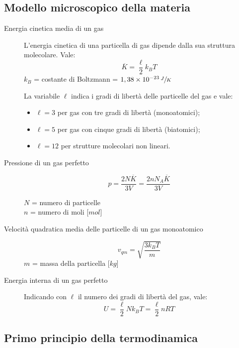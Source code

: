 \documentclass[a4paper,11pt,italian]{article}
\begin{document}
\subsection{Modello microscopico della materia}
\begin{description}
  \item[Energia cinetica media di un gas] 
  L'energia cinetica di una particella di gas dipende dalla sua struttura molecolare. Vale:
  \[ \overline{K} = \dfrac{\ell}{2}k_B T \]
  $ k_B $ = costante di Boltzmann = $ 1,38 \times 10^{-23} \, \sfrac{J}{K} $

  La variabile $ \ell $ indica i gradi di libertà delle particelle del gas e vale:
  \begin{itemize}
    \item $ \ell = 3 $ per gas con tre gradi di libertà (monoatomici);
    \item $ \ell = 5 $ per gas con cinque gradi di libertà (biatomici);
    \item $ \ell = 12 $ per strutture molecolari non lineari.
  \end{itemize}

  \item[Pressione di un gas perfetto] 
  \[ p = \frac{2 N \overline{K}}{3 V} = \frac{2 n N_A \overline{K}}{3 V} \]
  \begin{multicols}{2}
  $ N $ = numero di particelle\\
  $ n $ = numero di moli [$ mol $]
  \end{multicols}
  
  \item[Velocità quadratica media delle particelle di un gas monoatomico] 
  \[ v_{qm} = \sqrt{\frac{3 k_B T}{m}} \]
  $ m $ = massa della particella [$ kg $]
  
  \item[Energia interna di un gas perfetto] 
  Indicando con $ \ell $ il numero dei gradi di libertà del gas, vale:
  \[ U = \frac{\ell}{2} N k_B T = \frac{\ell}{2} n R T  \]
\end{description}

\subsection{Primo principio della termodinamica}
\end{document}
